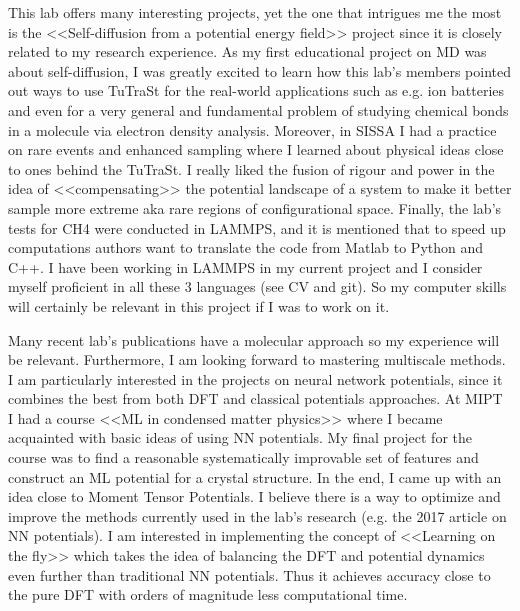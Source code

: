 \documentclass[12pt, a4paper]{awesome-cv}
\begin{document}
\begin{cvletter}
This lab offers many interesting projects, yet the one that intrigues me the most is the <<Self-diffusion from a potential energy field>> project since it is closely related to my research experience. As my first educational project on MD was about self-diffusion, I was greatly excited to learn how this lab's members pointed out ways to use TuTraSt for the real-world applications such as e.g. ion batteries and even for a very general and fundamental problem of studying chemical bonds in a molecule via electron density analysis. Moreover, in SISSA I had a practice on rare events and enhanced sampling where I learned about physical ideas close to ones behind the TuTraSt. I really liked the fusion of rigour and power in the idea of <<compensating>> the potential landscape of a system to make it better sample more extreme aka rare regions of configurational space. Finally, the lab’s tests for CH4 were conducted in LAMMPS, and it is mentioned that to speed up computations authors want to translate the code from Matlab to Python and C++. I have been working in LAMMPS in my current project and I consider myself proficient in all these 3 languages (see CV and git). So my computer skills will certainly be relevant in this project if I was to work on it.

\newpage

Many recent lab’s publications have a molecular approach so my experience will be relevant. Furthermore, I am looking forward to mastering multiscale methods. I am particularly interested in the projects on neural network potentials, since it combines the best from both DFT and classical potentials approaches. At MIPT I had a course <<ML in condensed matter physics>> where I became acquainted with basic ideas of using NN potentials. My final project for the course was to find a reasonable systematically improvable set of features and construct an ML potential for a crystal structure. In the end, I came up with an idea close to Moment Tensor Potentials. I believe there is a way to optimize and improve the methods currently used in the lab's research (e.g. the 2017 article on NN potentials). I am interested in implementing the concept of <<Learning on the fly>> which takes the idea of balancing the DFT and potential dynamics even further than traditional NN potentials. Thus it achieves accuracy close to the pure DFT with orders of magnitude less computational time.


\end{cvletter}
\end{document}
